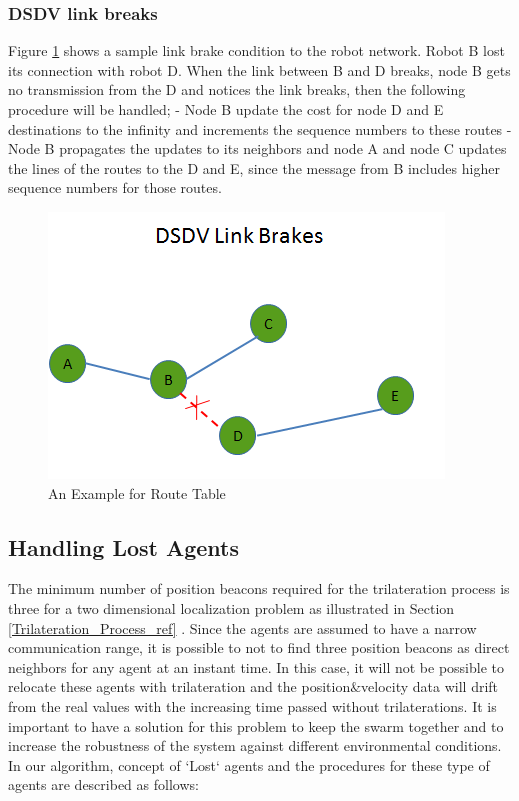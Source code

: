 \subsubsection{DSDV link breaks}

Figure \ref{linkk_brake} shows a sample link brake condition to the robot network. Robot B lost its connection with robot D. When the link between B and D breaks, node B gets no transmission from the D and notices the link breaks, then the following procedure will be handled; \newline
	- Node B update the cost for node D and E destinations to the infinity and increments the sequence numbers to these routes \newline
	- Node B propagates the updates to its neighbors and node A and node C updates the lines of the routes to the D and E, since the message from B includes higher sequence numbers for those routes.
		
\begin{figure}[H]
\caption{An Example for Route Table} \label{linkk_brake}
\centering
\includegraphics[scale = 0.65]{link_break}
\end{figure}
	
\subsection{Handling Lost Agents} \label{LostAgents}
The minimum number of position beacons required for the trilateration process is three for a two dimensional localization problem as illustrated in Section \ref{Trilateration_Process_ref} . Since the agents are assumed to have a narrow communication range, it is possible to not to find three  position beacons as direct neighbors for any agent at an instant time. In this case, it will not be possible to relocate these agents with trilateration and the position$\&$velocity data will drift from the real values with the increasing time passed without trilaterations. It is important to have a solution for this problem to keep the swarm together and to increase the robustness of the system against different environmental conditions. In our algorithm, concept of `Lost` agents and the procedures for these type of agents are described as follows:
	
